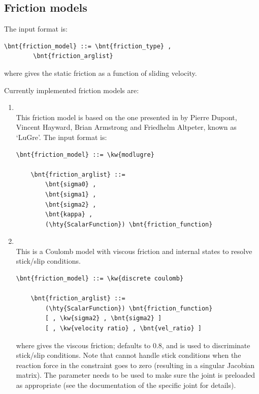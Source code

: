 \subsection{Friction models}
The  input format is:
\begin{Verbatim}[commandchars=\\\{\}]
    \bnt{friction_model} ::= \bnt{friction_type} ,
        \bnt{friction_arglist}
\end{Verbatim}
where  gives the static friction
as a function of sliding velocity.

Currently implemented friction models are:
\begin{enumerate}
\item {}\\
This friction model is based on the one presented in \cite{LUGRE-2002}
by Pierre Dupont, Vincent Hayward, Brian Armstrong and Friedhelm Altpeter,
known as `LuGre'.
The input format is:
\begin{Verbatim}[commandchars=\\\{\}]
    \bnt{friction_model} ::= \kw{modlugre}

    \bnt{friction_arglist} ::=
        \bnt{sigma0} ,
        \bnt{sigma1} ,
        \bnt{sigma2} ,
        \bnt{kappa} ,
        (\hty{ScalarFunction}) \bnt{friction_function}
\end{Verbatim}

    \item {}\\
    This is a Coulomb model with viscous friction and
    internal states to resolve stick/slip conditions.
\begin{Verbatim}[commandchars=\\\{\}]
    \bnt{friction_model} ::= \kw{discrete coulomb}

    \bnt{friction_arglist} ::=
        (\hty{ScalarFunction}) \bnt{friction_function}
        [ , \kw{sigma2} , \bnt{sigma2} ]
        [ , \kw{velocity ratio} , \bnt{vel_ratio} ]
\end{Verbatim}
    where  gives the viscous friction;
     defaults to 0.8, and is used
    to discriminate stick/slip conditions.
    Note that 
    cannot handle stick conditions when the reaction force
    in the constraint goes to zero (resulting in a singular Jacobian matrix).
    The  parameter needs to be used to make sure
    the joint is preloaded as appropriate
    (see the documentation of the specific joint for details).
\end{enumerate}

